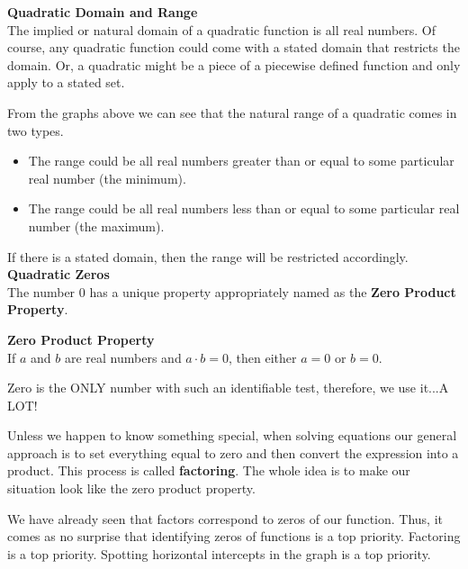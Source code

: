 \documentclass{ximera}
\begin{document}
\textbf{\textcolor{blue!75!black}{Quadratic Domain and Range}} \\


The implied or natural domain of a quadratic function is all real numbers.  Of course, any quadratic function could come with a stated domain that restricts the domain. Or, a quadratic might be a piece of a piecewise defined function and only apply to a stated set.

From the graphs above we can see that the natural range of a quadratic comes in two types.  

\begin{itemize}
\item The range could be all real numbers greater than or equal to some particular real number (the minimum).
\item The range could be all real numbers less than or equal to some particular real number (the maximum).
\end{itemize}

If there is a stated domain, then the range will be restricted accordingly. \\





\textbf{\textcolor{blue!75!black}{Quadratic Zeros}} \\

The number $0$ has a unique property appropriately named as the \textbf{Zero Product Property}.  



\begin{definition}  \textbf{\textcolor{green!50!black}{Zero Product Property}} \\

If $a$ and $b$ are real numbers and $a\cdot b = 0$, then either $a=0$ or $b=0$.

\end{definition}


Zero is the ONLY number with such an identifiable test, therefore, we use it...A LOT! 


Unless we happen to know something special, when solving equations our general approach is to set everything equal to zero and then convert the expression into a product.  This process is called \textbf{factoring}.  The whole idea is to make our situation look like the zero product property.

We have already seen that factors correspond to zeros of our function. Thus, it comes as no surprise that identifying zeros of functions is a top priority.  Factoring is a top priority. Spotting horizontal intercepts in the graph is a top priority.
\end{document}
